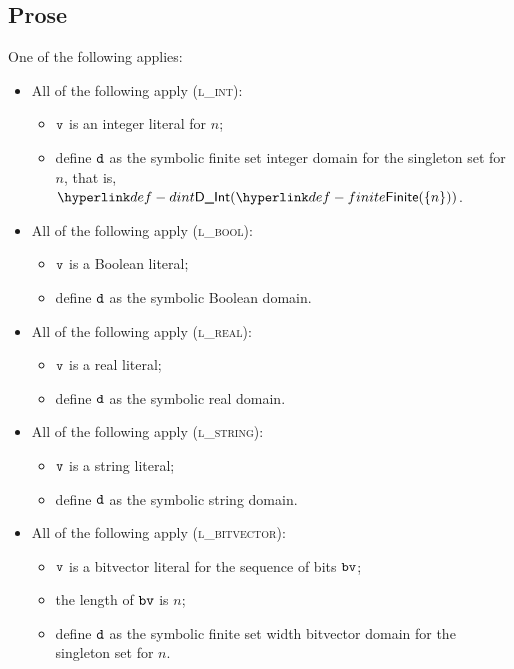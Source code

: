 \subsection{Prose}
One of the following applies:
\begin{itemize}
  \item All of the following apply (\textsc{l\_int}):
  \begin{itemize}
    \item $\texttt{v}$ is an integer literal for $n$;
    \item define $\texttt{d}$ as the symbolic finite set integer domain for the singleton set for $n$, that is, $\DInt(\Finite(\{n\}))$.
  \end{itemize}

  \item All of the following apply (\textsc{l\_bool}):
  \begin{itemize}
    \item $\texttt{v}$ is a Boolean literal;
    \item define $\texttt{d}$ as the symbolic Boolean domain.
  \end{itemize}

  \item All of the following apply (\textsc{l\_real}):
  \begin{itemize}
    \item $\texttt{v}$ is a real literal;
    \item define $\texttt{d}$ as the symbolic real domain.
  \end{itemize}

  \item All of the following apply (\textsc{l\_string}):
  \begin{itemize}
    \item $\texttt{v}$ is a string literal;
    \item define $\texttt{d}$ as the symbolic string domain.
  \end{itemize}

  \item All of the following apply (\textsc{l\_bitvector}):
  \begin{itemize}
    \item $\texttt{v}$ is a bitvector literal for the sequence of bits $\texttt{bv}$;
    \item the length of $\texttt{bv}$ is $n$;
    \item define $\texttt{d}$ as the symbolic finite set width bitvector domain for the singleton set for $n$.
  \end{itemize}
\end{itemize}

